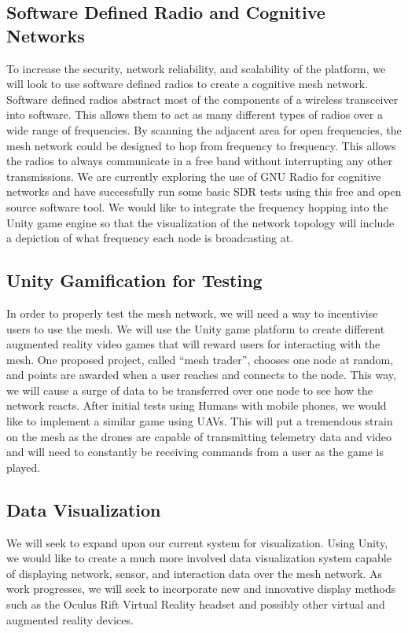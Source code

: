 \documentclass{IEEEtran}
\begin{document}
\subsection{Software Defined Radio and Cognitive Networks}

To increase the security, network reliability, and scalability of the platform, we will look to use software defined radios to create a cognitive mesh network. Software defined radios abstract most of the components of a wireless transceiver into software. This allows them to act as many different types of radios over a wide range of frequencies. By scanning the adjacent area for open frequencies, the mesh network could be designed to hop from frequency to frequency. This allows the radios to always communicate in a free band without interrupting any other transmissions. We are currently exploring the use of GNU Radio for cognitive networks and have successfully run some basic SDR tests using this free and open source software tool. We would like to integrate the frequency hopping into the Unity game engine so that the visualization of the network topology will include a depiction of what frequency each node is broadcasting at. 

\subsection{Unity Gamification for Testing}

In order to properly test the mesh network, we will need a way to incentivise users to use the mesh.  We will use the Unity game platform to create different augmented reality video games that will reward users for interacting with the mesh. One proposed project, called “mesh trader”, chooses one node at random, and points are awarded when a user reaches and connects to the node. This way, we will cause a surge of data to be transferred over one node to see how the network reacts. After initial tests using Humans with mobile phones, we would like to implement a similar game using UAVs. This will put a tremendous strain on the mesh as the drones are capable of transmitting telemetry data and video and will need to constantly be receiving commands from a user as the game is played. 

\subsection{Data Visualization}
We will seek to expand upon our current system for visualization. Using Unity, we would like to create a much more involved data visualization system capable of displaying network, sensor, and interaction data over the mesh network. As work progresses, we will seek to incorporate new and innovative display methods such as the Oculus Rift Virtual Reality headset and possibly other virtual and augmented reality devices. 
\end{document}
